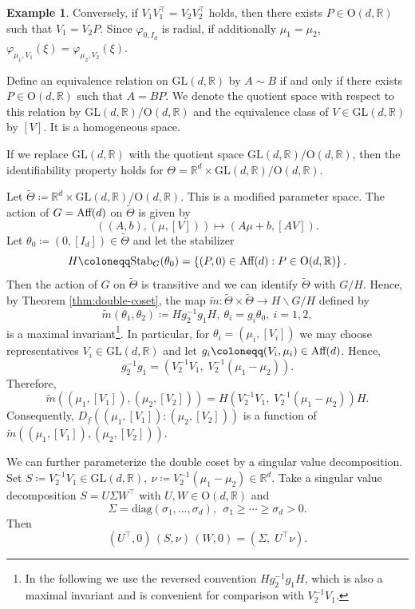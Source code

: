 \documentclass[a4paper, reqno, 11pt]{article}
\theoremstyle{definition}
\newtheorem{Exa}[Thm]{Example}
\def\GL{\mathrm{GL}}
\def\O{\mathrm{O}}
\begin{document}
\begin{Exa}
Conversely, 
if $V_1 V_1^{\top} = V_2 V_2^{\top}$ holds, then 
there exists $P \in \O(d, \mathbb{R})$ such that $V_1 = V_2 P$.  
Since $\varphi_{0, I_d} $ is radial, 
if additionally $\mu_1 = \mu_2$, 
$\varphi_{\mu_1, V_1}(\xi) = \varphi_{\mu_2, V_2}(\xi)$. 
 

Define an equivalence relation on $\GL(d, \mathbb{R})$ by 
$A \sim B$ if and only if there exists $P \in \O(d, \mathbb{R})$ such that $A = BP$. 
We denote the quotient space with respect to this relation by $\GL(d, \mathbb{R}) / \O(d,\mathbb{R})$ and the equivalence class of $V \in \GL(d,\mathbb{R})$ by $[V]$. 
It is a homogeneous space. 

If we replace $\GL(d, \mathbb{R})$ with the quotient space $\GL(d, \mathbb{R}) / \O(d,\mathbb{R})$, 
then the identifiability property holds for $\Theta = \mathbb{R}^d \times \GL(d, \mathbb{R}) / \O(d,\mathbb{R})$. 


Let $\widetilde\Theta \coloneqq  \mathbb{R}^d \times \GL(d, \mathbb{R}) / \O(d,\mathbb{R})$. 
This is a modified parameter space.  
The action of $G = \textup{Aff}(d)$ on $\widetilde\Theta$ is given by
\[ ((A,b),(\mu,[V])) \mapsto (A\mu+b,[AV]). \]
Let $\theta_0 \coloneqq  (0,[I_d]) \in \widetilde\Theta$ and let the stabilizer 
\[ H \coloneqq  \mathrm{Stab}_G(\theta_0) = \left\{(P,0)\in \textup{Aff}(d): P \in \O(d,\mathbb{R}) \right\}. \]
Then the action of $G$ on $\widetilde{\Theta}$ is transitive and we can identify $\widetilde{\Theta}$ with $G/H$.
Hence, by Theorem \ref{thm:double-coset}, 
the map $\widetilde m  \colon \widetilde\Theta \times \widetilde\Theta \to H \backslash G/H$
defined by
\[ \widetilde m(\theta_1,\theta_2) \coloneqq  H g_2^{-1}g_1 H, \ \theta_i = g_i \theta_0, \ i = 1,2, \]
is a maximal invariant\footnote{In the following we use the reversed convention $H g_2^{-1}g_1 H$, which is also a maximal invariant and is convenient for comparison with $V_2^{-1} V_1$.}.
In particular, for $\theta_{i} = \left(\mu_i, [V_i] \right)$ we may choose representatives
$V_i\in \GL(d,\mathbb{R})$ and let $g_i\coloneqq  (V_i,\mu_i)\in \textup{Aff}(d)$. 
Hence, 
\[ g_2^{-1}g_1 = \left(V_2^{-1}V_1,\; V_2^{-1}(\mu_1-\mu_2)\right). \]
Therefore, 
\[ \widetilde m\left((\mu_1,[V_1]),(\mu_2,[V_2]) \right) = H\left(V_2^{-1}V_1,\; V_2^{-1}(\mu_1-\mu_2)\right)H. \]
Consequently, $D_{f} \left((\mu_1,[V_1]):(\mu_2,[V_2]) \right)$ is a function of
$\widetilde m\left((\mu_1,[V_1]),(\mu_2,[V_2]) \right)$.

We can further parameterize the double coset by a singular value decomposition.
Set
$S \coloneqq  V_2^{-1}V_1\in \GL(d,\mathbb{R}), \  \nu \coloneqq  V_2^{-1}(\mu_1-\mu_2) \in \mathbb{R}^d$. 
Take a singular value decomposition $S = U\Sigma W^\top$ with
$U, W \in \O(d,\mathbb{R})$ and
\[ \Sigma = \mathrm{diag}(\sigma_1,\dots,\sigma_d), \  \ \sigma_1 \ge \cdots \ge \sigma_d >0. \]
Then
\[ \left(U^\top,0\right)\,(S,\nu)\,(W,0) = \left(\Sigma,\;U^\top \nu \right). \]


\end{Exa}
\end{document}
